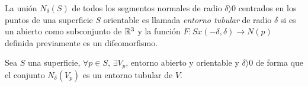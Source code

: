 \begin{definition}
La unión $N_\delta(S)$ de todos los segmentos normales de radio $\delta  \rangle  0$ centrados en los puntos de una superficie $S$ orientable es llamada \textit{entorno tubular} de radio $\delta$ si es un abierto como subconjunto de $\mathbb{R}^3$ y la función $F: S x (-\delta, \delta) \longrightarrow N(p)$ definida previamente es un difeomorfismo.
\end{definition}

\begin{lemma}
Sea $S$ una superficie, $\forall p \in S$, $\exists V_p$, entorno abierto y orientable y $\delta  \rangle  0$ de forma que el conjunto $N_\delta(V_p)$ es un entorno tubular de $V$.
\end{lemma}

